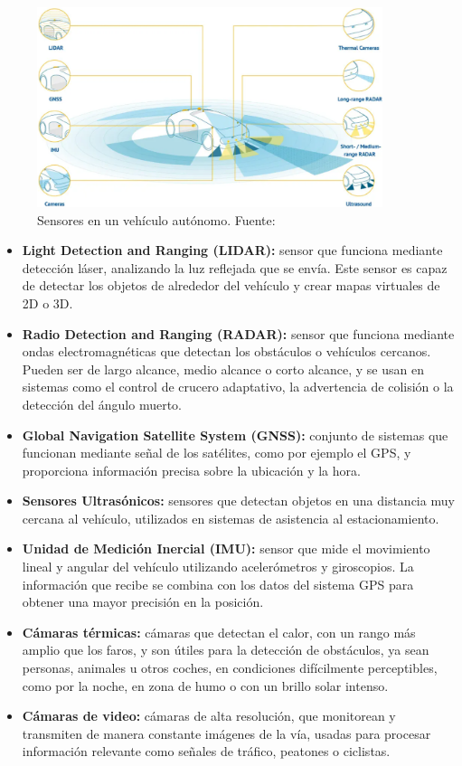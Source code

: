 \documentclass[12pt]{report} %
\begin{document}
\begin{figure}[h]
	\centering
	\includegraphics[width=0.9\textwidth]{saeSensors.png}
	\caption{Sensores en un vehículo autónomo. Fuente: \cite{autonomousVehicles}}
	\label{fig:imagen20}
\end{figure}

\begin{itemize}

    \item \textbf{Light Detection and Ranging (LIDAR):} sensor que funciona mediante detección láser, analizando la luz reflejada que se envía. Este sensor es capaz de detectar los objetos de alrededor del vehículo y crear mapas virtuales de 2D o 3D.
    \item \textbf{Radio Detection and Ranging (RADAR):} sensor que funciona mediante ondas electromagnéticas que detectan los obstáculos o vehículos cercanos. Pueden ser de largo alcance, medio alcance o corto alcance, y se usan en sistemas como el control de crucero adaptativo, la advertencia de colisión o la detección del ángulo muerto.
    \item \textbf{Global Navigation Satellite System (GNSS):} conjunto de sistemas que funcionan mediante señal de los satélites, como por ejemplo el GPS, y proporciona información precisa sobre la ubicación y la hora.
    \item \textbf{Sensores Ultrasónicos:} sensores que detectan objetos en una distancia muy cercana al vehículo, utilizados en sistemas de asistencia al estacionamiento.
    \item \textbf{Unidad de Medición Inercial (IMU):} sensor que mide el movimiento lineal y angular del vehículo utilizando acelerómetros y giroscopios. La información que recibe se combina con los datos del sistema GPS para obtener una mayor precisión en la posición.
    \item \textbf{Cámaras térmicas:} cámaras que detectan el calor, con un rango más amplio que los faros, y son útiles para la detección de obstáculos, ya sean personas, animales u otros coches, en condiciones difícilmente perceptibles, como por la noche, en zona de humo o con un brillo solar intenso.
    \item \textbf{Cámaras de video:} cámaras de alta resolución, que monitorean y transmiten de manera constante imágenes de la vía, usadas para procesar información relevante como señales de tráfico, peatones o ciclistas.

\end{itemize}
\end{document}
